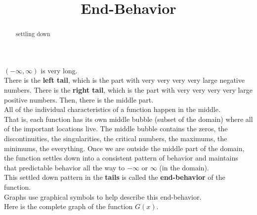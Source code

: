 \documentclass{ximera}
\title{End-Behavior}
\begin{document}
\begin{abstract}
settling down
\end{abstract}
\maketitle


$(-\infty, \infty)$ is very long. \\



There is the \textbf{\textcolor{red!80!black}{left tail}}, which is the part with very very very very large negative numbers. There is the \textbf{\textcolor{red!80!black}{right tail}}, which is the part with very very very very large positive numbers. Then, there is the middle part. \\

All of the individual characteristics of a function happen in the middle. \\

That is, each function has its own middle bubble (subset of the domain) where all of the important locations live.  The middle bubble contains the zeros, the discontinuities, the singularities, the critical numbers, the maximums, the minimums, the everything.  Once we are outside the middle part of the domain, the function settles down into a consistent pattern of behavior and maintains that predictable behavior all the way to $-\infty$ or $\infty$ (in the domain). \\

This settled down pattern in the \textbf{\textcolor{red!80!black}{tails}} is called the \textbf{\textcolor{red!80!black}{end-behavior}} of the function. \\


Graphs use graphical symbols to help describe this end-behavior.\\


Here is the complete graph of the function $G(x)$. \\
\end{document}

